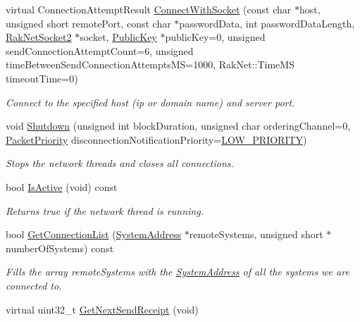 \begin{DoxyCompactItemize}
virtual Connection\-Attempt\-Result \hyperlink{class_rak_net_1_1_rak_peer_a8852b99f2d8919bee57fd457477292a0}{Connect\-With\-Socket} (const char $\ast$host, unsigned short remote\-Port, const char $\ast$password\-Data, int password\-Data\-Length, \hyperlink{class_rak_net_1_1_rak_net_socket2}{Rak\-Net\-Socket2} $\ast$socket, \hyperlink{struct_rak_net_1_1_public_key}{Public\-Key} $\ast$public\-Key=0, unsigned send\-Connection\-Attempt\-Count=6, unsigned time\-Between\-Send\-Connection\-Attempts\-M\-S=1000, Rak\-Net\-::\-Time\-M\-S timeout\-Time=0)
\begin{DoxyCompactList}\small\item\em Connect to the specified host (ip or domain name) and server port. \end{DoxyCompactList}\item 
void \hyperlink{class_rak_net_1_1_rak_peer_a0a6d4c16c9b489574393a39ab2f99990}{Shutdown} (unsigned int block\-Duration, unsigned char ordering\-Channel=0, \hyperlink{_packet_priority_8h_a659378374e516180f93640c79f59705c}{Packet\-Priority} disconnection\-Notification\-Priority=\hyperlink{_packet_priority_8h_a659378374e516180f93640c79f59705cadb8ee22a232a2787f32ba28da55c43c1}{L\-O\-W\-\_\-\-P\-R\-I\-O\-R\-I\-T\-Y})
\begin{DoxyCompactList}\small\item\em Stops the network threads and closes all connections. \end{DoxyCompactList}\item 
bool \hyperlink{class_rak_net_1_1_rak_peer_ae6bb2c4de0b24283b231154d29304e00}{Is\-Active} (void) const 
\begin{DoxyCompactList}\small\item\em Returns true if the network thread is running. \end{DoxyCompactList}\item 
bool \hyperlink{class_rak_net_1_1_rak_peer_a0af5b69face182410f2abb11da902dd4}{Get\-Connection\-List} (\hyperlink{struct_rak_net_1_1_system_address}{System\-Address} $\ast$remote\-Systems, unsigned short $\ast$number\-Of\-Systems) const 
\begin{DoxyCompactList}\small\item\em Fills the array remote\-Systems with the \hyperlink{struct_rak_net_1_1_system_address}{System\-Address} of all the systems we are connected to. \end{DoxyCompactList}\item 
virtual uint32\-\_\-t \hyperlink{class_rak_net_1_1_rak_peer_a1d6e283f476bdd4ed8b9b4c56693ecd1}{Get\-Next\-Send\-Receipt} (void)

\end{DoxyCompactItemize}
